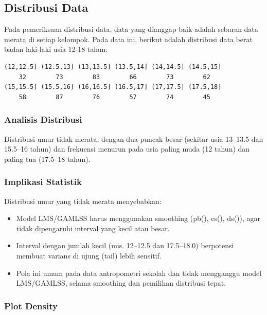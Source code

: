 \documentclass[11pt, a4paper]{article}
\begin{document}
\begin{enumerate}
\subsection{Distribusi Data}
Pada pemeriksaan distribusi data, data yang dianggap baik adalah sebaran data merata di setiap kelompok. Pada data ini, berikut adalah distribusi data berat badan laki-laki usia 12-18 tahun:
\begin{Verbatim}[frame=single]
(12,12.5] (12.5,13] (13,13.5] (13.5,14] (14,14.5] (14.5,15] 
    32        73        83        66        73        62 
(15,15.5] (15.5,16] (16,16.5] (16.5,17] (17,17.5] (17.5,18] 
    58        87        76        57        74        45 
\end{Verbatim}
\subsubsection{Analisis Distribusi}
Distribusi umur tidak merata, dengan dua puncak besar (sekitar usia 13–13.5 dan 15.5–16 tahun) dan frekuensi menurun pada usia paling muda (12 tahun) dan paling tua (17.5–18 tahun).

\subsubsection{Implikasi Statistik}
Distribusi umur yang tidak merata menyebabkan:
\begin{itemize}
    \item Model LMS/GAMLSS harus menggunakan smoothing (pb(), cs(), ds()), agar tidak dipengaruhi interval yang kecil atau besar.
    \item Interval dengan jumlah kecil (mis. 12–12.5 dan 17.5–18.0) berpotensi membuat varians di ujung (tail) lebih sensitif.
    \item Pola ini umum pada data antropometri sekolah dan tidak mengganggu model LMS/GAMLSS, selama smoothing dan pemilihan distribusi tepat.
\end{itemize}

\subsubsection{Plot Density}
\begin{figure}[H]
    \centering


\end{figure}
\end{enumerate}
\end{document}
